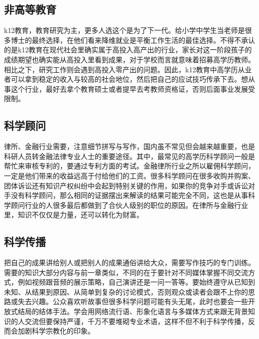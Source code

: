 \documentclass[]{tufte-book}
\begin{document}
\hypertarget{ux975eux9ad8ux7b49ux6559ux80b2}{%
\subsection{非高等教育}\label{ux975eux9ad8ux7b49ux6559ux80b2}}

k12教育，教育研究为主，更多人选这个是为了下一代。给小学中学生当老师是很多博士的最终选择，在他们看来降维就业是平衡工作生活的最佳选择。不得不承认的是k12教育在现代社会里确实属于高投入高产出的行业，家长对这一阶段孩子的成绩期望也确实能从高投入里看到成果，对于学校而言就意味着招募高学历教师。相比之下，研究工作则会遇到高投入零产出的问题。因此，k12教育中高学历从业者可以拿到稳定的收入与较高的社会地位，然后把自己的应试技巧传承下去。想从事这个行业，最好去拿个教育硕士或者提早去考教师资格证，否则后面事业发展受限制。

\hypertarget{ux79d1ux5b66ux987eux95ee}{%
\subsection{科学顾问}\label{ux79d1ux5b66ux987eux95ee}}

律所、金融行业需要，注意细节拼写与写作，国内虽不常见但会越来越重要，也是科研人员转金融法律专业人士的重要途径。其中，最常见的高学历科学顾问一般是帮忙来审核专利的，要通过专利方面的考试。金融律所行业之所以雇佣科学顾问，一定是他们带来的收益远高于付给他们的工资。很多科学顾问在很多收购并购案、团体诉讼还有知识产权纠纷中会起到特别关键的作用，如果你的竞争对手或诉讼对手没有科学顾问，那么相同的证据摆出来解读的结果可能完全不同，这也是从事科学顾问行业的人很多最后都做到了合伙人级别的职位的原因。在律所与金融行业里，知识不仅仅是力量，还可以转化为财富。

\hypertarget{ux79d1ux5b66ux4f20ux64ad}{%
\subsection{科学传播}\label{ux79d1ux5b66ux4f20ux64ad}}

把自己的成果讲给别人或把别人的成果通俗讲给大众，需要写作技巧的专门训练。需要的知识大部分内容与前一章类似，不同的在于要针对不同媒体掌握不同交流方式，例如视频跟音频的展示策略，自己演讲还是一问一答等。要始终遵守从已知到未知、从结果到原因、从简单到复杂的讨论模式，否则观众或读者会跟不上你的思路或失去兴趣。公众喜欢听故事但很多科学问题可能有头无尾，此时也要会一些开放式结局的结体手法。学会用网络流行语、形象化语言与多媒体方式来跟无背景知识的人交流但要保持严谨，千万不要堆砌专业术语，这样不但不利于科学传播，反而会加剧科学宗教化的印象。
\end{document}
